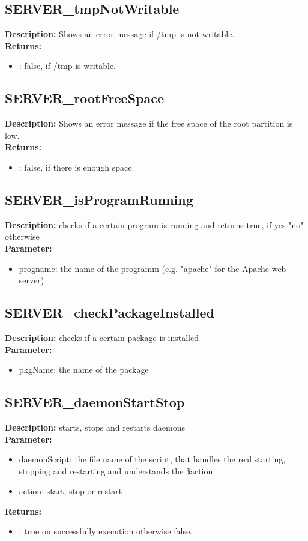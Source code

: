 \subsection{SERVER\_tmpNotWritable}
\textbf{Description:} Shows an error message if /tmp is not writable.\\
\textbf{Returns:}
\begin{itemize}
\item : false, if /tmp is writable.
\end{itemize}

\subsection{SERVER\_rootFreeSpace}
\textbf{Description:} Shows an error message if the free space of the root partition is low.\\
\textbf{Returns:}
\begin{itemize}
\item : false, if there is enough space.
\end{itemize}

\subsection{SERVER\_isProgramRunning}
\textbf{Description:} checks if a certain program is running and returns true, if yes "no" otherwise\\
\textbf{Parameter:}
\begin{itemize}
\item progname: the name of the programm (e.g. "apache" for the Apache web server)
\end{itemize}

\subsection{SERVER\_checkPackageInstalled}
\textbf{Description:} checks if a certain package is installed\\
\textbf{Parameter:}
\begin{itemize}
\item pkgName: the name of the package
\end{itemize}

\subsection{SERVER\_daemonStartStop}
\textbf{Description:} starts, stops and restarts daemons\\
\textbf{Parameter:}
\begin{itemize}
\item daemonScript: the file name of the script, that handles the real starting, stopping and restarting and understands the \$action
\item action: start, stop or restart
\end{itemize}
\textbf{Returns:}
\begin{itemize}
\item : true on successfully execution otherwise false.
\end{itemize}

